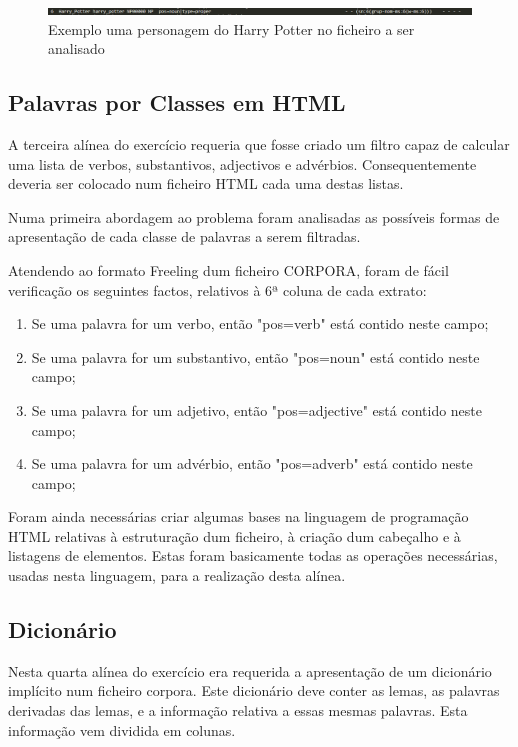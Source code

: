 \documentclass[11pt,a4paper]{report}
\begin{document}
\begin{figure}[H]
\centering
\includegraphics[scale=0.7]{harry1.png}
\caption{Exemplo uma personagem do Harry Potter no ficheiro a ser analisado}
\label{img:harry1}
\end{figure}

\subsection{Palavras por Classes em HTML}

A terceira alínea do exercício requeria que fosse criado um filtro capaz de calcular uma lista de verbos, substantivos, adjectivos e advérbios. Consequentemente deveria ser colocado num ficheiro HTML cada uma destas listas.

Numa primeira abordagem ao problema foram analisadas as possíveis formas de apresentação de cada classe de palavras a serem filtradas.

Atendendo ao formato Freeling dum ficheiro CORPORA, foram de fácil verificação os seguintes factos, relativos à 6ª coluna de cada extrato:

\begin{enumerate}
 \item Se uma palavra for um verbo, então "pos=verb" está contido neste campo;
 \item Se uma palavra for um substantivo, então "pos=noun" está contido neste campo;
 \item Se uma palavra for um adjetivo, então "pos=adjective" está contido neste campo;
 \item Se uma palavra for um advérbio, então "pos=adverb" está contido neste campo;
\end{enumerate}

Foram ainda necessárias criar algumas bases na linguagem de programação HTML relativas à estruturação dum ficheiro, à criação dum cabeçalho e à listagens de elementos. Estas foram basicamente todas as operações necessárias, usadas nesta linguagem, para a realização desta alínea.


\subsection{Dicionário}
\label{subsec:analise4}

Nesta quarta alínea do exercício era requerida a apresentação de um dicionário implícito num ficheiro corpora. Este dicionário deve conter as lemas, as palavras derivadas das lemas, e a informação relativa a essas mesmas palavras. Esta informação vem dividida em colunas.
\end{document}
